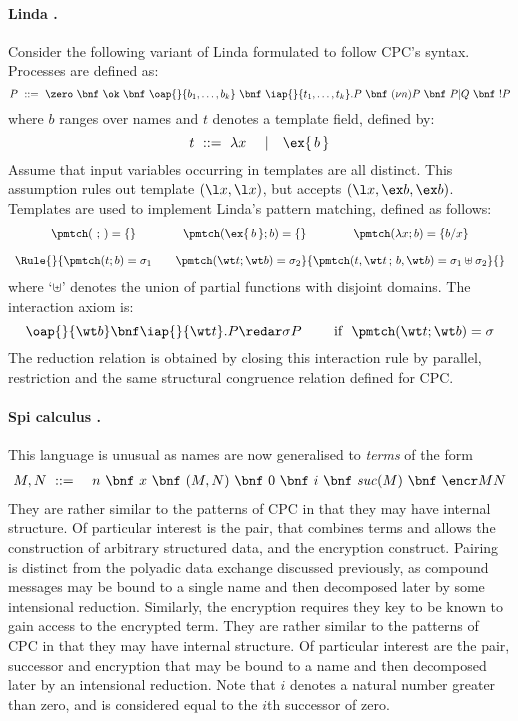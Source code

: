 \documentclass{LMCS}
\begin{document}
\paragraph{Linda \cite{Gel85}.} Consider the following variant of Linda formulated to follow 
CPC's syntax. Processes are defined as:
$$
P \ ::= \ \zero \ \bnf \ \ok \ \bnf \ \oap {} {b_1,\ldots,b_k} \ \bnf \ \iap {} {t_1,\ldots,t_k}.P \ \bnf \ 
(\nu n) P \ \bnf \ P | Q \ \bnf \ !P
$$
where $b$ ranges over names and $t$ denotes a template field, defined by:
$$
t \ ::=\ \lambda x\ \quad |\quad \ex {\,b\,}
$$
Assume that input variables occurring in templates are all distinct.
This assumption rules out template $(\l x,\l x)$, but accepts $(\l x,
\ex b,\ex b)$.  Templates are used to implement Linda's pattern
matching, defined as follows:
$$
\begin{array}{c}
\vspace*{.4cm}
\pmtch(\ ; \, ) = \{\}
\qquad\qquad
\pmtch(\ex {\,b\,} ; b) = \{\}
\qquad\qquad
\pmtch(\lambda x ; b) = \{b/x\}
\\
\Rule{}
{\pmtch(t ; b) = \sigma_1 \qquad \pmtch(\wt t ; \wt b) = \sigma_2}
{\pmtch(t,\wt t\, ;\, b,\wt b) = \sigma_1 \uplus \sigma_2}
{}
\end{array}
$$
where
`$\uplus$' denotes the union of partial functions with disjoint domains. The interaction axiom is:
$$
\oap {} {\wt b}\bnf \iap{}{\wt t}.P \redar \sigma P
\qquad \mbox{ if }\ \pmtch(\wt t ; \wt b) = \sigma
$$
The reduction relation is obtained by closing this interaction rule by parallel, restriction and the
same structural congruence relation defined for CPC.


\paragraph{Spi calculus \cite{gordon1997ccp}.} This language is unusual as names 
are now generalised to {\em terms} of the form
\begin{eqnarray*}
M,N \ &::=&\  n \ \bnf\  x \ \bnf\  (M,N)
\ \bnf\  0 \ \bnf\  i \ \bnf\  {\it suc}(M) \ \bnf\  \encr M N
\end{eqnarray*}
{They are rather similar to the patterns of CPC in that they may have
internal structure. Of
particular interest is the pair, that combines terms and allows the
construction of arbitrary structured data,
and the encryption construct.
Pairing is distinct from the polyadic data exchange
discussed previously, as compound messages may be bound to a single name
and then
decomposed later by some intensional reduction. Similarly, the encryption 
requires they key to be known to gain access to the encrypted term.}
{They are rather similar to the patterns of CPC in that they may have internal
structure. Of particular interest are the pair, successor and encryption that
may be bound to a name and then decomposed later by an intensional reduction.
Note that $i$ denotes a natural number greater than zero, and is considered
equal to the $i$th successor of zero.}
\end{document}
